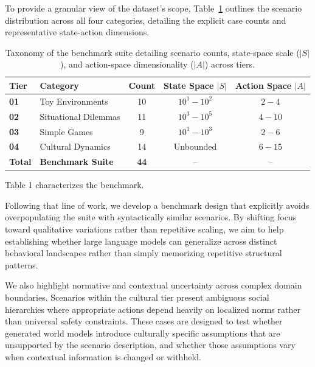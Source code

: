 \documentclass{article}
\begin{document}
To provide a granular view of the dataset's scope, Table~\ref{tab:dataset_taxonomy} outlines the scenario distribution across all four categories, detailing the explicit case counts and representative state-action dimensions.

\begin{table}[t]
\centering
\small
\caption{Taxonomy of the benchmark suite detailing scenario counts, state-space scale ($|S|$), and action-space dimensionality ($|A|$) across tiers.}
\label{tab:dataset_taxonomy}
\begin{tabularx}{\linewidth}{l X c c c}
\toprule
\textbf{Tier} & \textbf{Category} & \textbf{Count} & \textbf{State Space $|S|$} & \textbf{Action Space $|A|$} \\
\midrule
\textbf{01} & Toy Environments & 10 & $10^1 - 10^2$ & $2 - 4$ \\
\textbf{02} & Situational Dilemmas & 11 & $10^3 - 10^5$ & $4 - 10$ \\
\textbf{03} & Simple Games & 9 & $10^1 - 10^3$ & $2 - 6$ \\
\textbf{04} & Cultural Dynamics & 14 & Unbounded & $6 - 15$ \\
\midrule
\textbf{Total} & \textbf{Benchmark Suite} & \textbf{44} & -- & -- \\
\bottomrule
\end{tabularx}
\end{table}
Table 1 characterizes the benchmark. %

Following that line of work, we develop a benchmark design that explicitly avoids overpopulating the suite with syntactically similar scenarios. By shifting focus toward qualitative variations rather than repetitive scaling, we aim to help establishing whether large language models can generalize across distinct behavioral landscapes rather than simply memorizing repetitive structural patterns.

We also highlight normative and contextual uncertainty across complex domain boundaries. Scenarios within the cultural tier present ambiguous social hierarchies where appropriate actions depend heavily on localized norms rather than universal safety constraints. These cases are designed to test whether generated world models introduce culturally specific assumptions that are unsupported by the scenario description, and whether those assumptions vary when contextual information is changed or withheld.
\end{document}
